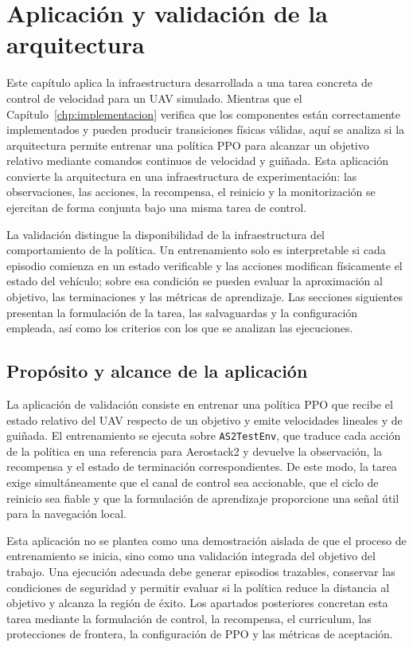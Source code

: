 \chapter{Aplicación y validación de la arquitectura} \label{chp:pruebas}

Este capítulo aplica la infraestructura desarrollada a una tarea concreta de
control de velocidad para un UAV simulado. Mientras que el
Capítulo~\ref{chp:implementacion} verifica que los componentes están correctamente
implementados y pueden producir transiciones físicas válidas, aquí se analiza si
la arquitectura permite entrenar una política PPO para alcanzar un objetivo
relativo mediante comandos continuos de velocidad y guiñada. Esta aplicación
convierte la arquitectura en una infraestructura de experimentación: las observaciones, las
acciones, la recompensa, el reinicio y la monitorización se ejercitan de forma
conjunta bajo una misma tarea de control.

La validación distingue la disponibilidad de la infraestructura del
comportamiento de la política. Un entrenamiento solo es interpretable si cada
episodio comienza en un estado verificable y las acciones modifican físicamente
el estado del vehículo; sobre esa condición se pueden evaluar la aproximación al
objetivo, las terminaciones y las métricas de aprendizaje. Las secciones
siguientes presentan la formulación de la tarea, las salvaguardas y la
configuración empleada, así como los criterios con los que se analizan las
ejecuciones.

\section{Propósito y alcance de la aplicación} \label{sct:aplicacion:alcance}

La aplicación de validación consiste en entrenar una política PPO que recibe el
estado relativo del UAV respecto de un objetivo y emite velocidades lineales y
de guiñada. El entrenamiento se ejecuta sobre \texttt{AS2TestEnv}, que traduce
cada acción de la política en una referencia para Aerostack2 y devuelve la
observación, la recompensa y el estado de terminación correspondientes. De este
modo, la tarea exige simultáneamente que el canal de control sea accionable, que
el ciclo de reinicio sea fiable y que la formulación de aprendizaje proporcione
una señal útil para la navegación local.

Esta aplicación no se plantea como una demostración aislada de que el proceso de
entrenamiento se inicia, sino como una validación integrada del objetivo del
trabajo. Una ejecución adecuada debe generar episodios trazables, conservar las
condiciones de seguridad y permitir evaluar si la política reduce la distancia
al objetivo y alcanza la región de éxito. Los apartados posteriores concretan
esta tarea mediante la formulación de control, la recompensa, el curriculum, las
protecciones de frontera, la configuración de PPO y las métricas de aceptación.

